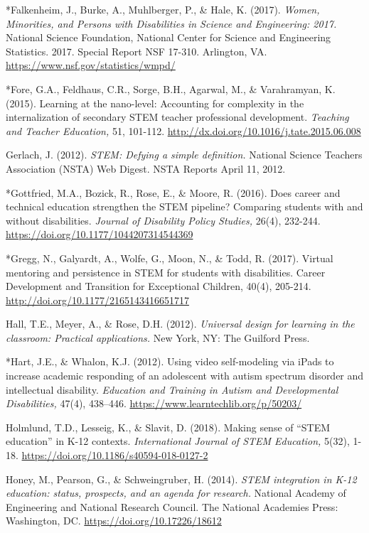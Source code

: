 \documentclass[11.5pt]{sig-alternate}
\begin{document}
*Falkenheim, J., Burke, A., Muhlberger, P., \& Hale, K. (2017). \textit{Women, Minorities, and Persons with Disabilities in Science and Engineering: 2017.} National Science Foundation, National Center for Science and Engineering Statistics. 2017. Special Report NSF 17-310. Arlington, VA. \url{https://www.nsf.gov/statistics/wmpd/}

*Fore, G.A., Feldhaus, C.R., Sorge, B.H., Agarwal, M., \& Varahramyan, K. (2015). Learning at the nano-level: Accounting for complexity in the internalization of secondary STEM teacher professional development. \textit{Teaching and Teacher Education,} 51, 101-112. \url{http://dx.doi.org/10.1016/j.tate.2015.06.008}

Gerlach, J. (2012). \textit{STEM: Defying a simple definition.} National Science Teachers Association (NSTA) Web Digest. NSTA Reports April 11, 2012. 
 
*Gottfried, M.A., Bozick, R., Rose, E., \& Moore, R. (2016). Does career and technical education strengthen the STEM pipeline? Comparing students with and without disabilities. \textit{Journal of Disability Policy Studies,} 26(4), 232-244. \url{https://doi.org/10.1177/1044207314544369}

*Gregg, N., Galyardt, A., Wolfe, G., Moon, N., \& Todd, R. (2017). Virtual mentoring and persistence in STEM for students with disabilities. Career Development and Transition for Exceptional Children, 40(4), 205-214. \url{http://doi.org/10.1177/2165143416651717}

Hall, T.E., Meyer, A., \& Rose, D.H. (2012). \textit{Universal design for learning in the classroom: Practical applications.} New York, NY: The Guilford Press.  

*Hart, J.E., \& Whalon, K.J. (2012). Using video self-modeling via iPads to increase academic responding of an adolescent with autism spectrum disorder and intellectual disability. \textit{Education and Training in Autism and Developmental Disabilities,} 47(4), 438–446. \url{https://www.learntechlib.org/p/50203/}

Holmlund, T.D., Lesseig, K., \& Slavit, D. (2018). Making sense of “STEM education” in K-12 contexts. \textit{International Journal of STEM Education,} 5(32), 1-18. \url{https://doi.org/10.1186/s40594-018-0127-2}

Honey, M., Pearson, G., \& Schweingruber, H. (2014). \textit{STEM integration in K-12 education: status, prospects, and an agenda for research.} National Academy of Engineering and National Research Council. The National Academies Press: Washington, DC. \url{https://doi.org/10.17226/18612}
\end{document}
